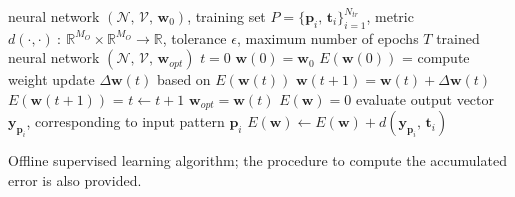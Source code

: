 \documentclass[12pt, a4paper, twoside, openright, notitlepage]{report}
\numberwithin{equation}{chapter}
\theoremstyle{theorem}
\theoremstyle{definition}
\theoremstyle{remark}
\theoremstyle{proposition}
\numberwithin{figure}{chapter}
\begin{document}
		\begin{algorithm}[t]
			\begin{algorithmic}[1]
				\Require neural network $\left( \mathcal{N}, \, \mathcal{V}, \, \mathbf{w}_0 \right)$, training set $P = \big\lbrace \mathbf{p}_i, \, \mathbf{t}_i \big\rbrace_{i = 1}^{N_{tr}}$, 
				\Statex \hspace*{0.535cm} metric $d(\cdot,\cdot) ~ : ~ \mathbb{R}^{M_O} \times \mathbb{R}^{M_O} \rightarrow \mathbb{R}$, tolerance $\epsilon$, maximum number of epochs $T$
				\Ensure trained neural network $\left( \mathcal{N}, \, \mathcal{V}, \, \mathbf{w}_{opt} \right)$
				\vspace*{0.2cm}
				\State $t = 0$
				\State $\mathbf{w}(0) = \mathbf{w}_0$
				\State $E(\mathbf{w}(0))$ = 
					\State compute weight update $\Delta \mathbf{w}(t)$ based on $E(\mathbf{w}(t))$
					\State $\mathbf{w}(t+1) = \mathbf{w}(t) + \Delta \mathbf{w}(t)$
					\State $E(\mathbf{w}(t+1))$ = 
					\State $t \leftarrow t+1$					
				\EndWhile		
				\State $\mathbf{w}_{opt} = \mathbf{w}(t)$
				\vspace*{0.2cm}
					\State $E(\mathbf{w}) = 0$
						\State evaluate output vector $\mathbf{y}_{\mathbf{p}_i}$, corresponding to input pattern $\mathbf{p}_i$
						\State $E(\mathbf{w}) \leftarrow E(\mathbf{w}) + d(\mathbf{y}_{\mathbf{p}_i}, \, \mathbf{t}_i)$
					\EndFor
				\EndFunction
			\end{algorithmic}
			
			\caption{Offline supervised learning algorithm; the procedure to compute the accumulated error is also provided.}
			\label{alg:offline-learning}
		\end{algorithm}
		
\end{document}
